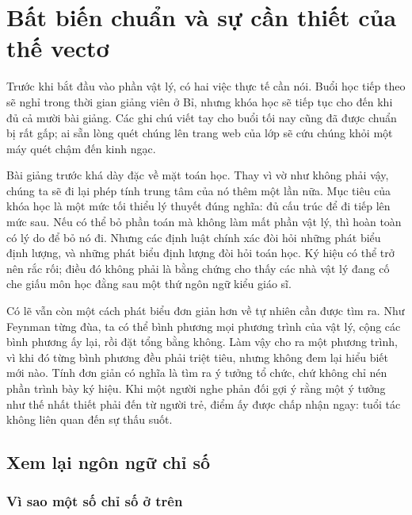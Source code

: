 \chapter{Bất biến chuẩn và sự cần thiết của thế vectơ}

Trước khi bắt đầu vào phần vật lý, có hai việc thực tế cần nói. Buổi học tiếp theo sẽ nghỉ trong thời gian giảng viên ở Bỉ, nhưng khóa học sẽ tiếp tục cho đến khi đủ cả mười bài giảng. Các ghi chú viết tay cho buổi tối nay cũng đã được chuẩn bị rất gấp; ai sẵn lòng quét chúng lên trang web của lớp sẽ cứu chúng khỏi một máy quét chậm đến kinh ngạc.

Bài giảng trước khá dày đặc về mặt toán học. Thay vì vờ như không phải vậy, chúng ta sẽ đi lại phép tính trung tâm của nó thêm một lần nữa. Mục tiêu của khóa học là một mức tối thiểu lý thuyết đúng nghĩa: đủ cấu trúc để đi tiếp lên mức sau. Nếu có thể bỏ phần toán mà không làm mất phần vật lý, thì hoàn toàn có lý do để bỏ nó đi. Nhưng các định luật chính xác đòi hỏi những phát biểu định lượng, và những phát biểu định lượng đòi hỏi toán học. Ký hiệu có thể trở nên rắc rối; điều đó không phải là bằng chứng cho thấy các nhà vật lý đang cố che giấu môn học đằng sau một thứ ngôn ngữ kiểu giáo sĩ.

Có lẽ vẫn còn một cách phát biểu đơn giản hơn về tự nhiên cần được tìm ra. Như Feynman từng đùa, ta có thể bình phương mọi phương trình của vật lý, cộng các bình phương ấy lại, rồi đặt tổng bằng không. Làm vậy cho ra một phương trình, vì khi đó từng bình phương đều phải triệt tiêu, nhưng không đem lại hiểu biết mới nào. Tính đơn giản có nghĩa là tìm ra ý tưởng tổ chức, chứ không chỉ nén phần trình bày ký hiệu. Khi một người nghe phản đối gợi ý rằng một ý tưởng như thế nhất thiết phải đến từ người trẻ, điểm ấy được chấp nhận ngay: tuổi tác không liên quan đến sự thấu suốt.


\section{Xem lại ngôn ngữ chỉ số}

\subsection{Vì sao một số chỉ số ở trên}

